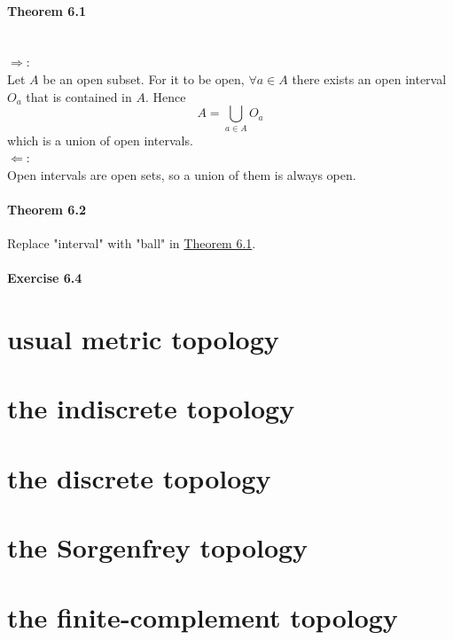 \subsection{Theorem 6.1} \label{thm4.6.1}
\setcounter{question}{0}


\begin{solution}
 \\$\Rightarrow$: \\
 Let $A$ be an open subset. For it to be open, $\forall a \in A$ there exists an open interval $O_a$ that is contained in $A$. Hence
 $$A = \bigcup_{a \in A} O_a$$
 which is a union of open intervals. \\
 $\Leftarrow$: \\
 Open intervals are open sets, so a union of them is always open.
\end{solution}

\subsection{Theorem 6.2}
\setcounter{question}{0}


\begin{solution}
 Replace "interval" with "ball" in \hyperref[thm4.6.1]{Theorem 6.1}.
\end{solution}

\subsection{Exercise 6.4}
\setcounter{question}{0}


\begin{parts}
 \part{usual metric topology}
 \part{the indiscrete topology}
 \part{the discrete topology}
 \part{the Sorgenfrey topology}
 \part{the finite-complement topology}
\end{parts}

